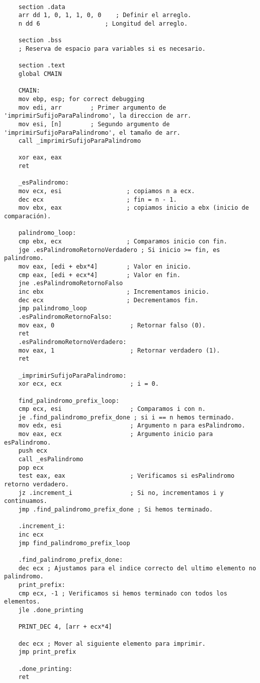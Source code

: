 \documentclass{article}
\begin{document}
	\begin{lstlisting}[language={[x86masm]Assembler}, caption=Código Tribonacci en Ensamblador]
	%include "io.inc"
	
	section .data
	arr dd 1, 0, 1, 1, 0, 0    ; Definir el arreglo.
	n dd 6                  ; Longitud del arreglo.
	
	section .bss
	; Reserva de espacio para variables si es necesario.
	
	section .text
	global CMAIN
	
	CMAIN:
	mov ebp, esp; for correct debugging
	mov edi, arr        ; Primer argumento de 'imprimirSufijoParaPalindromo', la direccion de arr.
	mov esi, [n]        ; Segundo argumento de 'imprimirSufijoParaPalindromo', el tamaño de arr.
	call _imprimirSufijoParaPalindromo
	
	xor eax, eax
	ret
	
	_esPalindromo:
	mov ecx, esi                  ; copiamos n a ecx.
	dec ecx                       ; fin = n - 1.
	mov ebx, eax                  ; copiamos inicio a ebx (inicio de comparación).
	
	palindromo_loop:
	cmp ebx, ecx                  ; Comparamos inicio con fin.
	jge .esPalindromoRetornoVerdadero ; Si inicio >= fin, es palindromo.
	mov eax, [edi + ebx*4]        ; Valor en inicio.
	cmp eax, [edi + ecx*4]        ; Valor en fin.
	jne .esPalindromoRetornoFalso
	inc ebx                       ; Incrementamos inicio.
	dec ecx                       ; Decrementamos fin.
	jmp palindromo_loop
	.esPalindromoRetornoFalso:
	mov eax, 0                     ; Retornar falso (0).
	ret
	.esPalindromoRetornoVerdadero:
	mov eax, 1                     ; Retornar verdadero (1).
	ret
	
	_imprimirSufijoParaPalindromo:
	xor ecx, ecx                   ; i = 0.
	
	find_palindromo_prefix_loop:
	cmp ecx, esi                   ; Comparamos i con n.
	je .find_palindromo_prefix_done ; si i == n hemos terminado.
	mov edx, esi                   ; Argumento n para esPalindromo.
	mov eax, ecx                   ; Argumento inicio para esPalindromo.
	push ecx
	call _esPalindromo
	pop ecx
	test eax, eax                  ; Verificamos si esPalindromo retorno verdadero.
	jz .increment_i                ; Si no, incrementamos i y continuamos.
	jmp .find_palindromo_prefix_done ; Si hemos terminado.
	
	.increment_i:
	inc ecx
	jmp find_palindromo_prefix_loop
	
	.find_palindromo_prefix_done:
	dec ecx ; Ajustamos para el indice correcto del ultimo elemento no palindromo.
	print_prefix:
	cmp ecx, -1 ; Verificamos si hemos terminado con todos los elementos.
	jle .done_printing
	
	PRINT_DEC 4, [arr + ecx*4]
	
	dec ecx ; Mover al siguiente elemento para imprimir.
	jmp print_prefix
	
	.done_printing:
	ret
	\end{lstlisting}
	
	
	
\end{document}
